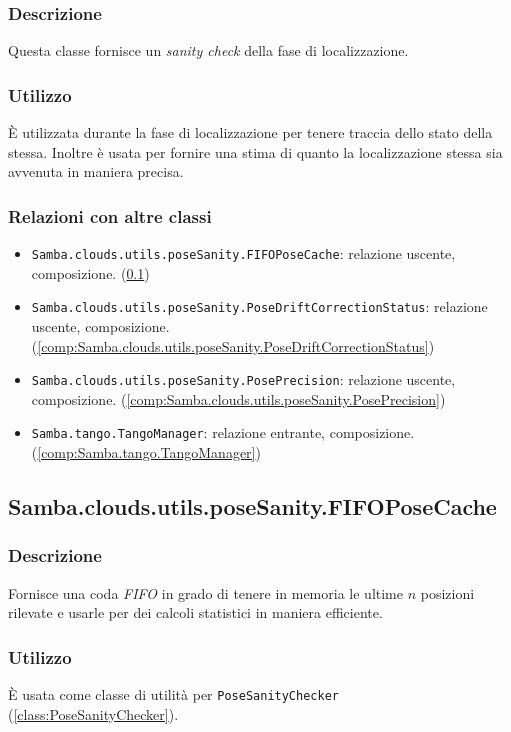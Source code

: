 \subsubsection{Descrizione}
Questa classe fornisce un \emph{sanity check} della fase di localizzazione.
\subsubsection{Utilizzo}
È utilizzata durante la fase di localizzazione per tenere traccia dello stato della stessa. Inoltre è usata per fornire una stima di quanto la localizzazione stessa sia avvenuta in maniera precisa.
\subsubsection{Relazioni con altre classi}
\begin{itemize}
	\item \texttt{Samba.clouds.utils.poseSanity.FIFOPoseCache}: relazione uscente, composizione. (\ref{comp:Samba.clouds.utils.poseSanity.FIFOPoseCache})
	\item \texttt{Samba.clouds.utils.poseSanity.PoseDriftCorrectionStatus}: relazione uscente, composizione. (\ref{comp:Samba.clouds.utils.poseSanity.PoseDriftCorrectionStatus})
	\item \texttt{Samba.clouds.utils.poseSanity.PosePrecision}: relazione uscente, composizione. (\ref{comp:Samba.clouds.utils.poseSanity.PosePrecision})
	\item \texttt{Samba.tango.TangoManager}: relazione entrante, composizione. (\ref{comp:Samba.tango.TangoManager})
\end{itemize}

\subsection{Samba.clouds.utils.poseSanity.FIFOPoseCache}\label{comp:Samba.clouds.utils.poseSanity.FIFOPoseCache}
\subsubsection{Descrizione}
Fornisce una coda \emph{FIFO} in grado di tenere in memoria le ultime $n$ posizioni rilevate e usarle per dei calcoli statistici in maniera efficiente.
\subsubsection{Utilizzo}
È usata come classe di utilità per \texttt{PoseSanityChecker} (\ref{class:PoseSanityChecker}).
